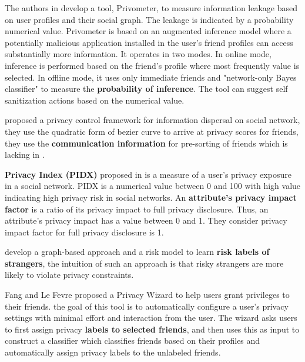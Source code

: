 The authors in \cite{talukder_privometer_2010} develop a tool,
	Privometer,
	to measure information leakage based on user profiles and their social graph.
The leakage is indicated by a probability numerical value.
Privometer is based on an augmented inference model where a potentially malicious application installed in the user’s friend profiles can access substantially more information.
It operates in two modes.
In online mode,
	inference is performed based on the friend’s profile where most frequently value is selected.
In offline mode,
	it uses only immediate friends and "network-only Bayes classifier" to measure the \textbf{probability of inference}.
The tool can suggest self sanitization actions based on the numerical value.


\cite{b.s._privacy_2015} proposed a privacy control framework for information dispersal on social network,
	they use the quadratic form of bezier curve to arrive at privacy scores for friends,
	they use the \textbf{communication information} for pre-sorting of friends which is lacking in \cite{vidyalakshmi_privacy_2015}.

\textbf{Privacy Index (PIDX)} proposed in \cite{nepali_sonet_2013} is a measure of a user’s privacy exposure in a social network.
PIDX is a numerical value between 0 and 100 with high value indicating high privacy risk in social networks.
An \textbf{attribute’s privacy impact factor} is a ratio of its privacy impact to full privacy disclosure.
Thus,
	an attribute’s privacy impact has a value between 0 and 1.
They consider privacy impact factor for full privacy disclosure is 1.


\cite{akcora_risks_2012} develop a graph-based approach and a risk model to learn \textbf{risk labels of strangers},
	the intuition of such an approach is that risky strangers are more likely to violate privacy constraints.

Fang and Le Fevre \cite{fang_privacy_2010} proposed a Privacy Wizard to help users grant privileges to their friends.
	the goal of this tool is to automatically configure a user’s privacy settings with minimal effort and interaction from the user.
The wizard asks users to first assign privacy \textbf{labels to selected friends},
	and then uses this as input to construct a classifier which classifies friends based on their profiles and automatically assign privacy labels to the unlabeled friends.

